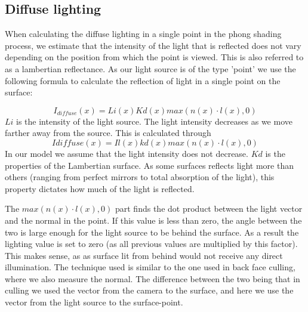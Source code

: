 \subsection{Diffuse lighting}
When calculating the diffuse lighting in a single point in the phong shading
process, we estimate that the intensity of the light that is reflected does not
vary depending on the position from which the point is viewed. This is also
referred to as a lambertian reflectance. As our light source is of the type
'point' we use the following formula to calculate the reflection of light in a
single point on the surface:

$$I_{diffuse}(x) = Li(x) Kd(x) max(n(x) · l(x), 0)$$ $Li$ is the intensity of
the light source. The light intensity decreases as we move farther away from
the source. This is calculated through $$Idiffuse(x) = Il(x) kd(x) max(n(x) ·
l(x), 0)$$
 In our model we assume that the light intensity does not decrease.
$Kd$ is the properties of the Lambertian surface. As some surfaces reflects
light more than others (ranging from perfect mirrors to total absorption of the
light), this property dictates how much of the light is reflected.

The $max(n(x) · l(x), 0)$ part finds the dot product between the light vector
and the normal in the point. If this value is less than zero, the angle between
the two is large enough for the light source to be behind the surface. As a
result the lighting value is set to zero (as all previous values are multiplied
by this factor). This makes sense, as as surface lit from behind would not
receive any direct illumination. The technique used is similar to the one used
in back face culling, where we also measure the normal. The difference between
the two being that in culling we used the vector from the camera to the
surface, and here we use the vector from the light source to the surface-point. 
